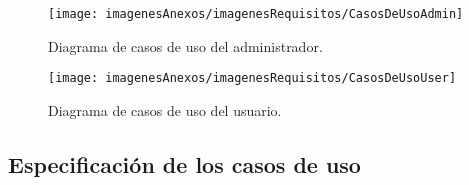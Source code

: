 \begin{figure}[]
    \begin{center}%
        \begin{center}%
          \texttt{[image: imagenesAnexos/imagenesRequisitos/CasosDeUsoAdmin]}%
          \caption{Diagrama de casos de uso del administrador.}%
          \label{figCasosUsoAdmin}%
        \end{center}%
  	\end{center}%
\end{figure}%

\begin{figure}[]
    \begin{center}%
        \begin{center}%
          \texttt{[image: imagenesAnexos/imagenesRequisitos/CasosDeUsoUser]}%
          \caption{Diagrama de casos de uso del usuario.}%
          \label{figCasosUsoUser}%
        \end{center}%
  	\end{center}%
\end{figure}%
 
\newpage

\subsection{Especificación de los casos de uso}



